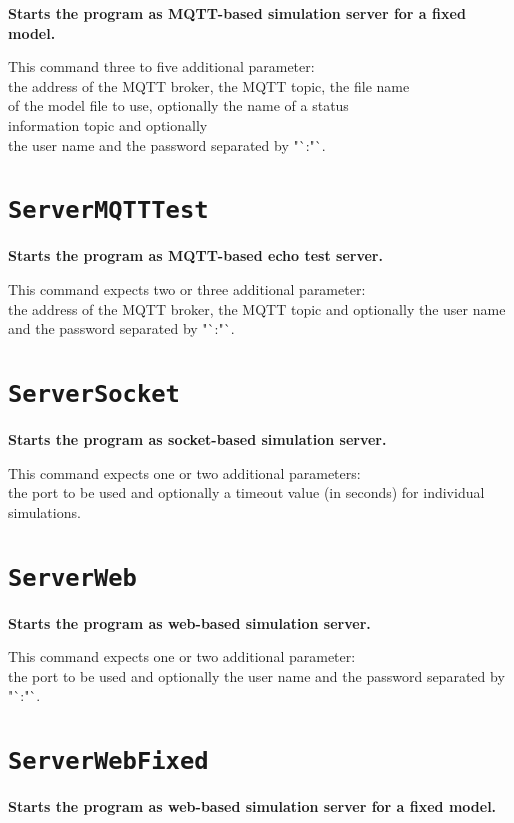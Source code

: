 \textbf{Starts the program as MQTT-based simulation server for a fixed model.}

This command three to five additional parameter:\\
the address of the MQTT broker, the MQTT topic, the file name\\
of the model file to use, optionally the name of a status\\
information topic and optionally\\
the user name and the password separated by "`:"`.

\section{\texttt{ServerMQTTTest}}

\textbf{Starts the program as MQTT-based echo test server.}

This command expects two or three additional parameter:\\
the address of the MQTT broker, the MQTT topic and optionally the user name and the password separated by "`:"`.

\section{\texttt{ServerSocket}}

\textbf{Starts the program as socket-based simulation server.}

This command expects one or two additional parameters:\\
the port to be used and optionally a timeout value (in seconds) for individual simulations.

\section{\texttt{ServerWeb}}

\textbf{Starts the program as web-based simulation server.}

This command expects one or two additional parameter:\\
the port to be used and optionally the user name and the password separated by "`:"`.

\section{\texttt{ServerWebFixed}}

\textbf{Starts the program as web-based simulation server for a fixed model.}

